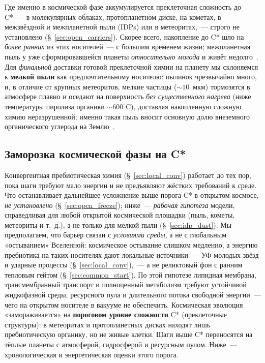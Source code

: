 \documentclass[12pt,a4paper]{article}
\begin{document}
Где именно в космической фазе аккумулируется преклеточная сложность до C*~--- в молекулярных облаках, протопланетном диске, на кометах, в межзвёздной и межпланетной пыли (IDPs) или в метеоритах,~--- строго не установлено (\S~\ref{sec:open_carriers}). Скорее всего, накопление до C* шло на \emph{более ранних} из этих носителей~--- с большим временем жизни; межпланетная пыль у уже сформировавшейся планеты \emph{относительно молода} и живёт недолго~\cite{Nesvorny2010,Grun1985}. Для \emph{финальной} доставки готовой преклеточной химии на планету мы склоняемся к \textbf{мелкой пыли} как предпочтительному носителю: пылинок чрезвычайно много, и, в отличие от крупных метеоритов, мелкие частицы ($\sim 10$~мкм) тормозятся в атмосфере плавно и оседают на поверхность \emph{без существенного нагрева} (ниже температуры пиролиза органики $\sim 600^\circ$C), доставляя накопленную сложную химию неразрушенной; именно такая пыль вносит основную долю внеземного органического углерода на Землю~\cite{Anders1989,ChybaSagan1992,Flynn2004}.

\subsection{Заморозка космической фазы на C*}
\label{sec:freeze}
\label{sec:cstar_dust}

Конвергентная пребиотическая химия (\S~\ref{sec:local_conv}) работает до тех пор, пока шаги требуют мало энергии и не предъявляют жёстких требований к среде. Что останавливает дальнейшее усложнение выше порога C* в открытом космосе, \emph{не установлено} (\S~\ref{sec:open_freeze}); ниже~--- \emph{рабочая гипотеза} модели, справедливая для любой открытой космической площадки (пыль, кометы, метеориты и т.~д.), а не только для мелкой пыли (\S~\ref{sec:idp_dust}). Мы предполагаем, что барьер связан с \emph{условиями среды}, а не с глобальным «остыванием» Вселенной: космическое остывание слишком медленно, а энергию пребиотика на таких носителях дают локальные источники~--- УФ молодых звёзд и ударные процессы (\S~\ref{sec:local_conv}),~--- а не реликтовый фон с ранним тепловым гейтом (\S~\ref{sec:common_start}). По этой гипотезе липидная мембрана, трансмембранный транспорт и полноценный метаболизм требуют устойчивой жидкофазной среды, ресурсного пула и длительного потока свободной энергии~--- чего на открытом носителе в вакууме не обеспечить. Космическая эволюция «замораживается» на \textbf{пороговом уровне сложности} C* (преклеточные структуры): в метеоритах и протопланетных дисках находят лишь пребиотическую органику, но не живые клетки. Шаги выше C* переносятся на тёплые планеты с атмосферой, гидросферой и ресурсным пулом. Ниже~--- хронологическая и энергетическая оценки этого порога.
\end{document}
